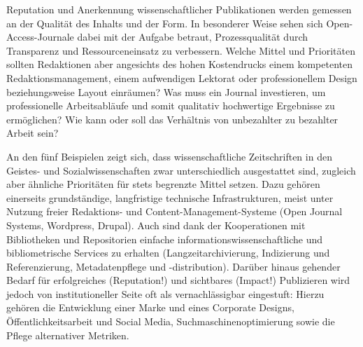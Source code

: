 \documentclass[a4paper,
fontsize=11pt,
oneside,
numbers=noperiodatend,
parskip=half-,
bibliography=totoc,
final
]{scrartcl}
\begin{document}
Reputation und Anerkennung wissenschaftlicher Publikationen werden
gemessen an der Qualität des Inhalts und der Form. In besonderer Weise
sehen sich Open-Access-Journale dabei mit der Aufgabe betraut,
Prozessqualität durch Transparenz und Ressourceneinsatz zu verbessern.
Welche Mittel und Prioritäten sollten Redaktionen aber angesichts des
hohen Kostendrucks einem kompetenten Redaktionsmanagement, einem
aufwendigen Lektorat oder professionellem Design beziehungsweise Layout
einräumen? Was muss ein Journal investieren, um professionelle
Arbeitsabläufe und somit qualitativ hochwertige Ergebnisse zu
ermöglichen? Wie kann oder soll das Verhältnis von unbezahlter zu
bezahlter Arbeit sein?

An den fünf Beispielen zeigt sich, dass wissenschaftliche Zeitschriften
in den Geistes- und Sozialwissenschaften zwar unterschiedlich
ausgestattet sind, zugleich aber ähnliche Prioritäten für stets
begrenzte Mittel setzen. Dazu gehören einerseits grundständige,
langfristige technische Infrastrukturen, meist unter Nutzung freier
Redaktions- und Content-Management-Systeme (Open Journal Systems,
Wordpress, Drupal). Auch sind dank der Kooperationen mit Bibliotheken
und Repositorien einfache informationswissenschaftliche und
bibliometrische Services zu erhalten (Langzeitarchivierung, Indizierung
und Referenzierung, Metadatenpflege und -distri\-bution). Darüber hinaus
gehender Bedarf für erfolgreiches (Reputation!) und sichtbares (Impact!)
Publizieren wird jedoch von institutioneller Seite oft als
vernachlässigbar eingestuft: Hierzu gehören die Entwicklung einer Marke
und eines Corporate Designs, Öffentlichkeitsarbeit und Social Media,
Suchmaschinenoptimierung sowie die Pflege alternativer Metriken.
\end{document}
